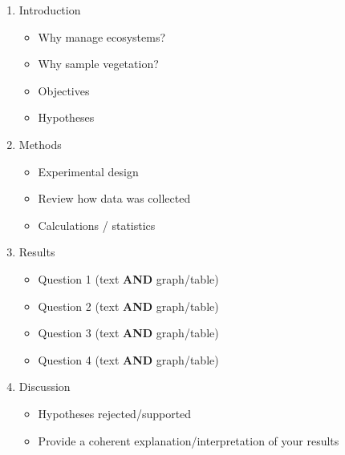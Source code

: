 \documentclass[11pt,]{article}
\providecommand{\tightlist}{%
\setlength{\itemsep}{0pt}\setlength{\parskip}{0pt}}
\begin{document}
\begin{enumerate}
\def\labelenumi{\arabic{enumi}.}
\tightlist
\item
  Introduction

  \begin{itemize}
  \tightlist
  \item
    Why manage ecosystems?
  \item
    Why sample vegetation?
  \item
    Objectives
  \item
    Hypotheses
  \end{itemize}
\item
  Methods

  \begin{itemize}
  \tightlist
  \item
    Experimental design
  \item
    Review how data was collected
  \item
    Calculations / statistics
  \end{itemize}
\item
  Results

  \begin{itemize}
  \tightlist
  \item
    Question 1 (text \textbf{AND} graph/table)
  \item
    Question 2 (text \textbf{AND} graph/table)
  \item
    Question 3 (text \textbf{AND} graph/table)
  \item
    Question 4 (text \textbf{AND} graph/table)
  \end{itemize}
\item
  Discussion

  \begin{itemize}
  \tightlist
  \item
    Hypotheses rejected/supported
  \item
    Provide a coherent explanation/interpretation of your results
  \end{itemize}
\end{enumerate}




\newpage
\singlespacing 
\end{document}

